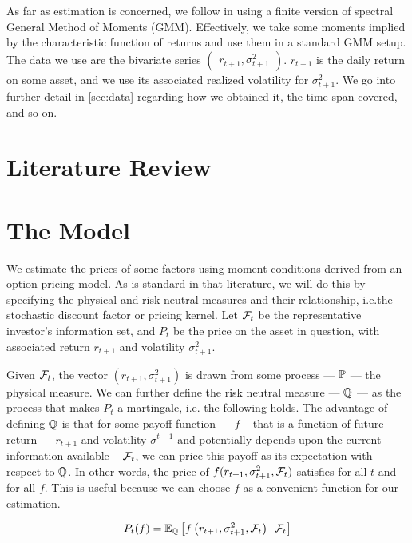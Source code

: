 \documentclass[11pt, letterpaper, twoside, final]{article}
\begin{document}
As far as estimation is concerned, we follow \textcite{khrapov2016affine} in using a finite version of spectral
General Method of Moments (GMM).
Effectively, we take some moments implied by the characteristic function of returns and use them in a standard GMM
setup.
The data we use are the bivariate series $\begin{pmatrix} r_{t+1}, \sigma^2_{t+1} \end{pmatrix}$.
$r_{t+1}$ is the daily return on some asset, and we use its associated realized volatility for $\sigma^2_{t+1}$.
We go into further detail in \cref{sec:data} regarding how we obtained it, the time-span covered, and so on.

\section{Literature Review}\label{sec:lit_review}


\section{The Model}\label{sec:model}

\addtocounter{subsection}{1}

We estimate the prices of some factors using moment conditions derived from an option pricing model. 
As is standard in that literature, we will do  this by specifying the physical and risk-neutral measures and their
relationship, i.e.\@ the stochastic discount factor or pricing kernel.
Let $\mathcal{F}_t$ be the representative investor's information set, and $P_t$ be the price on the asset in question, with
associated return $r_{t+1}$ and volatility  $\sigma^2_{t+1}$.

Given $\mathcal{F}_{t}$, the vector $\left( r_{t+1},  \sigma^2_{t+1}\right)$ is drawn from some process --- $\mathbb{P}$ --- the
physical measure. 
We can further define the risk neutral measure --- $\mathbb{Q}$ ---  as the process that makes $P_t$ a martingale, i.e.\@
the following holds. 
The advantage of defining $\mathbb{Q}$ is that for some payoff function --- $f$  -- that is a function of future return
--- $r_{t+1}$ and volatility $\sigma^{t+1}$ and potentially depends upon the current information available --
$\mathcal{F}_t$, we can price this payoff as its expectation with respect to $\mathbb{Q}$.
In other  words, the price of $f(r_{t+1}, \sigma^2_{t+1}, \mathcal{F}_t)$ satisfies for all $t$ and for all $f$.
This is useful because we can choose $f$ as a convenient function for our estimation. 

\begin{equation}
    P_t(f) = \operatorname{\mathbb{E}}_{\mathbb{Q}}\left[ f\left(r_{t+1}, \sigma^2_{t+1}, \mathcal{F}_{t}\right)  \,\middle\vert\, \mathcal{F}_{t}\right]
\end{equation}
\end{document}
